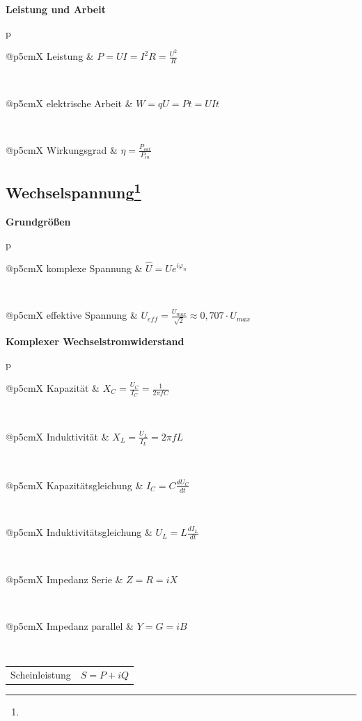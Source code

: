 \documentclass[12pt,a4paper, twoside]{article}
\makeatletter
\renewcommand{\d}[2]{\frac{d #1}{d #2}}
\renewcommand{\=}[1]{\stackrel{#1}{=}}
\theoremstyle{definition}
\theoremstyle{remark}
\newcommand{\concept}[2]{%
\noindent
\begin{framed}
\noindent\textbf{#1}
\par\begin{tabular}{p{\linewidth}}
#2
\end{tabular}
\end{framed}
}
\newcommand{\f}[2]{%
\noindent\begin{tabularx}{\linewidth}{@{}p{5cm}X}
#1 & $#2$
\end{tabularx}}
\makeatother
\begin{document}
\concept{Leistung und Arbeit}{
\f{Leistung}{P = U I = I^2 R = \frac{U^2}{R}}\\
\f{elektrische Arbeit}{W = q U = P t = U I t}\\
\f{Wirkungsgrad}{\eta = \frac{P_{out}}{P_{in}}}

}



\subsection[Wechselspannung]{Wechselspannung\let\thefootnote\relax\footnote{}}

\concept{Grundgrößen}{
\f{komplexe Spannung}{\hat U = U e^{i \varphi_n}}\\
\f{effektive Spannung}{U_{eff} = \frac{U_{max}}{\sqrt{2}} \approx 0,707 \cdot U_{max}}

}

\concept{Komplexer Wechselstromwiderstand}{
\f{Kapazität}{X_C = \frac{U_C}{I_C} = \frac{1}{2\pi f C}}\\
\f{Induktivität}{X_L = \frac{U_L}{I_L} = 2\pi f L}\\
\f{Kapazitätsgleichung}{I_C = C \d{U_C}{t}}\\
\f{Induktivitätsgleichung}{U_L = L \d{I_L}{t}}\\
\f{Impedanz Serie}{Z = R = i X}\\
\f{Impedanz parallel}{Y = G = i B}\\
\f{Scheinleistung}{S = P + i Q}
}
\end{document}
